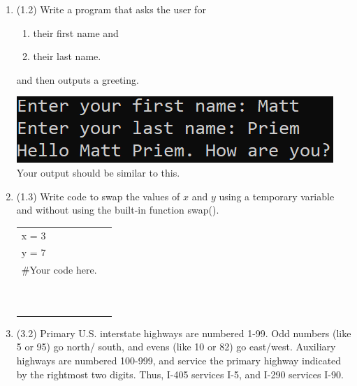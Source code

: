 \documentclass{article}
\begin{document}
\begin{enumerate}
\item (1.2) 
		Write a program that asks the user for \\
		\begin{minipage}{0.5\textwidth}
		\vspace*{-0.5em}
			\begin{enumerate}  \setlength\itemsep{-0.3em}
				\item their first name and
				\item their last name.  
			\end{enumerate} \vspace*{-1ex}
		and then outputs a greeting.
		\end{minipage}
		\begin{minipage}{0.5\textwidth}
			\centering
			\includegraphics[scale=0.9]{./imgs/outputGreeting.png}\\
			Your output should be similar to this.
		\end{minipage}


\item (1.3) 
		Write code to swap the values of $x$ and $y$ using a temporary variable and without using
		the built-in function swap().\\		
		\begin{tabular}{|ll}
			\\			
			x = 3\\
			y = 7\\[5pt]
			\#Your code here. \\[5pt]
			& \\ & \\ & \\ & \\ & \\ & \\ & \\ & \\ & \\ & \\ 
		\end{tabular}



\item (3.2)  
		Primary U.S. interstate highways are numbered 1-99.  Odd numbers (like 5 or 95) go north/
		south, and evens (like 10 or 82) go east/west.  Auxiliary highways are numbered 100-999, and 
		service the primary highway indicated by the rightmost two digits.  Thus, I-405 services 
		I-5, and I-290 services I-90.
		

\end{enumerate}
\end{document}
